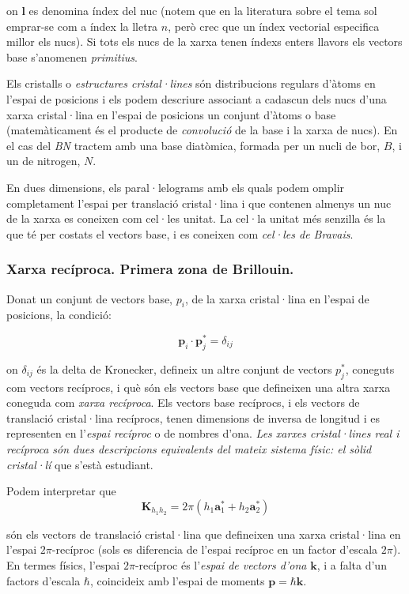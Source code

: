 \documentclass[12pt]{article} %
\let\vec\mathbf %
\begin{document}
on $\vec l$ es denomina índex del nuc (notem que en la literatura sobre el tema sol emprar-se com a índex la lletra $n$, però crec que un índex vectorial especifica millor els nucs). Si tots els nucs de la xarxa tenen índexs enters llavors els vectors base s'anomenen \emph{primitius}.

Els cristalls o \emph{estructures cristal·lines} són distribucions regulars d'àtoms en l'espai de posicions i els podem descriure associant a cadascun dels nucs d'una xarxa cristal·lina en l'espai de posicions un conjunt d'àtoms o base (matemàticament és el producte de \emph{convolució} de la base i la xarxa de nucs). En el cas del \emph{BN} tractem amb una base diatòmica, formada per un nucli de bor, $B$, i un de nitrogen, $N$. 

En dues dimensions, els paral·lelograms amb els quals podem omplir completament l'espai per translació cristal·lina i que contenen almenys un nuc de la xarxa es coneixen com cel·les unitat. La cel·la unitat més senzilla és la que té per costats el vectors base, i es coneixen com \emph{cel·les de Bravais}.

\subsubsection{Xarxa recíproca. Primera zona de Brillouin.}
Donat un conjunt de vectors base, $p_i$, de la xarxa cristal·lina en l'espai de posicions, la condició:

\begin{equation}
\label{eq:rec1}
\vec p_i\cdot\vec p_j^{*}=\delta_{ij}
\end{equation}

on $\delta_{ij}$ és la delta de Kronecker, defineix un altre conjunt de vectors $p_j^*$, coneguts com vectors recíprocs, i què són els vectors base que defineixen una altra xarxa coneguda com \textit{xarxa recíproca}. Els  vectors base recíprocs, i els vectors de translació cristal·lina recíprocs, tenen dimensions de inversa de longitud i es representen en l'\textit{espai recíproc} o de nombres d'ona. \textit{Les xarxes cristal·lines real i recíproca són dues descripcions equivalents del mateix sistema físic: el sòlid cristal·lí} que s'està estudiant.

Podem interpretar que
\begin{equation}
\label{eq:rec3}
\vec K_{h_1h_2}=2\pi\left(h_1\vec a_1^{*}+h_2\vec a_2^{*}\right)
\end{equation}

són els vectors de translació cristal·lina que defineixen una xarxa cristal·lina en l'espai $2\pi$-recíproc (sols es diferencia de l'espai recíproc en un factor d'escala $2\pi$). En termes físics, l'espai $2\pi$-recíproc és l'\emph{espai de vectors d'ona} $\vec k$, i a falta d'un factors d'escala $\hbar$, coincideix amb l'espai de moments  $\vec p=\hbar\vec k$.
\end{document}
